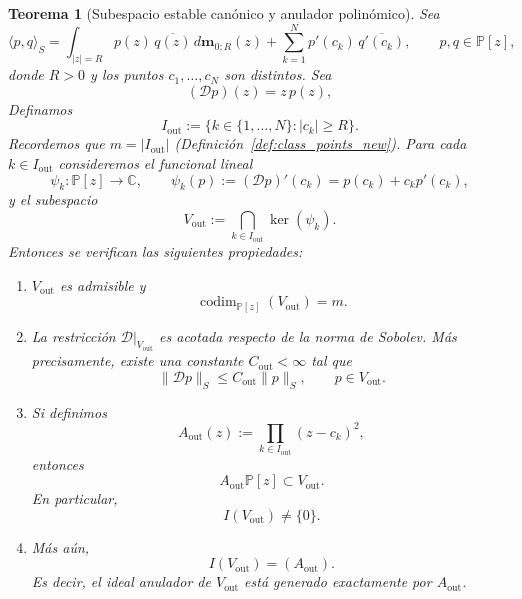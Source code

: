 \documentclass[12pt,a4paper]{article}
\newtheorem{theorem}{Teorema}
\theoremstyle{definition}
\theoremstyle{remark}
\newcommand{\Poly}{\mathbb{P}[z]}
\newcommand{\D}{\mathcal{D}}
\begin{document}
\begin{theorem}[Subespacio estable canónico y anulador polinómico]
  \label{thm:Vout_anulador}
  Sea
  \[
    \langle p,q\rangle_S
    =
    \int_{|z|=R} p(z)\,\overline{q(z)}\,d\mathbf{m}_{0;R}(z)
    +
    \sum_{k=1}^N p'(c_k)\,\overline{q'(c_k)},
    \qquad p,q\in \Poly,
  \]
  donde $R>0$ y los puntos $c_1,\dots,c_N$ son distintos. Sea
  \[
    (\D p)(z)=z\,p(z),
  \]
  Definamos
  \[
    I_{\mathrm{out}}:=\{k\in\{1,\dots,N\}: |c_k|\ge R\}.
  \]
  Recordemos que $m=|I_{\mathrm{out}}|$ (Definición~\ref{def:class_points_new}).
  Para cada $k\in I_{\mathrm{out}}$ consideremos el funcional lineal
  \[
    \psi_k:\Poly\to\mathbb C,
    \qquad
    \psi_k(p):=(\D p)'(c_k)=p(c_k)+c_kp'(c_k),
  \]
  y el subespacio
  \[
    V_{\mathrm{out}}:=\bigcap_{k\in I_{\mathrm{out}}}\ker(\psi_k).
  \]
  Entonces se verifican las siguientes propiedades:

  \begin{enumerate}
    \item $V_{\mathrm{out}}$ es admisible y
          \[
            \operatorname{codim}_{\Poly}(V_{\mathrm{out}})=m.
          \]

    \item La restricción $\D|_{V_{\mathrm{out}}}$ es acotada respecto de la norma
          de Sobolev. Más precisamente, existe una constante $C_{\mathrm{out}}<\infty$ tal que
          \[
            \|\D p\|_S\le C_{\mathrm{out}}\|p\|_S,
            \qquad p\in V_{\mathrm{out}}.
          \]

    \item Si definimos
          \[
            A_{\mathrm{out}}(z):=\prod_{k\in I_{\mathrm{out}}}(z-c_k)^2,
          \]
          entonces
          \[
            A_{\mathrm{out}}\Poly\subset V_{\mathrm{out}}.
          \]
          En particular,
          \[
            I(V_{\mathrm{out}})\neq \{0\}.
          \]

    \item Más aún,
          \[
            I(V_{\mathrm{out}})=(A_{\mathrm{out}}).
          \]
          Es decir, el ideal anulador de $V_{\mathrm{out}}$ está generado exactamente por
          $A_{\mathrm{out}}$.
  \end{enumerate}
\end{theorem}
\end{document}
